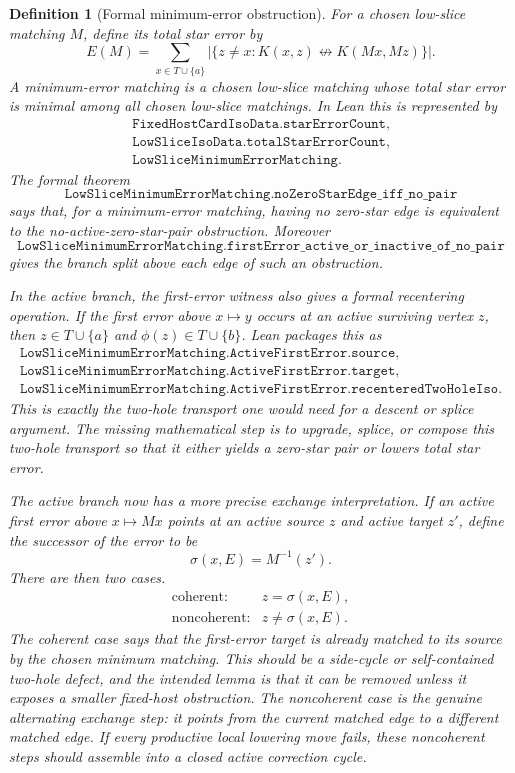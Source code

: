 \documentclass[11pt]{article}
\newtheorem{definition}{Definition}
\begin{document}
\begin{definition}[Formal minimum-error obstruction]
For a chosen low-slice matching \(M\), define its total star error by
\[
  E(M)=\sum_{x\in T\cup\{a\}}
  \left|\{z\neq x:K(x,z)\not\leftrightarrow K(Mx,Mz)\}\right|.
\]
A minimum-error matching is a chosen low-slice matching whose total star error
is minimal among all chosen low-slice matchings.  In Lean this is represented
by
\[
\begin{array}{l}
\texttt{FixedHostCardIsoData.starErrorCount},\\
\texttt{LowSliceIsoData.totalStarErrorCount},\\
\texttt{LowSliceMinimumErrorMatching}.
\end{array}
\]
The formal theorem
\[
  \texttt{LowSliceMinimumErrorMatching.noZeroStarEdge\_iff\_no\_pair}
\]
says that, for a minimum-error matching, having no zero-star edge is equivalent
to the no-active-zero-star-pair obstruction.  Moreover
\[
  \texttt{LowSliceMinimumErrorMatching.firstError\_active\_or\_inactive\_of\_no\_pair}
\]
gives the branch split above each edge of such an obstruction.

In the active branch, the first-error witness also gives a formal recentering
operation.  If the first error above \(x\mapsto y\) occurs at an active
surviving vertex \(z\), then \(z\in T\cup\{a\}\) and \(\phi(z)\in T\cup\{b\}\).
Lean packages this as
\[
\begin{array}{l}
\texttt{LowSliceMinimumErrorMatching.ActiveFirstError.source},\\
\texttt{LowSliceMinimumErrorMatching.ActiveFirstError.target},\\
\texttt{LowSliceMinimumErrorMatching.ActiveFirstError.recenteredTwoHoleIso}.
\end{array}
\]
This is exactly the two-hole transport one would need for a descent or splice
argument.  The missing mathematical step is to upgrade, splice, or compose this
two-hole transport so that it either yields a zero-star pair or lowers total
star error.

The active branch now has a more precise exchange interpretation.  If an active
first error above \(x\mapsto Mx\) points at an active source \(z\) and active
target \(z'\), define the successor of the error to be
\[
  \sigma(x,E)=M^{-1}(z').
\]
There are then two cases.
\[
\begin{array}{ll}
\text{coherent:} & z=\sigma(x,E),\\
\text{noncoherent:} & z\neq \sigma(x,E).
\end{array}
\]
The coherent case says that the first-error target is already matched to its
source by the chosen minimum matching.  This should be a side-cycle or
self-contained two-hole defect, and the intended lemma is that it can be
removed unless it exposes a smaller fixed-host obstruction.  The noncoherent
case is the genuine alternating exchange step: it points from the current
matched edge to a different matched edge.  If every productive local lowering
move fails, these noncoherent steps should assemble into a closed active
correction cycle.


\end{definition}
\end{document}
